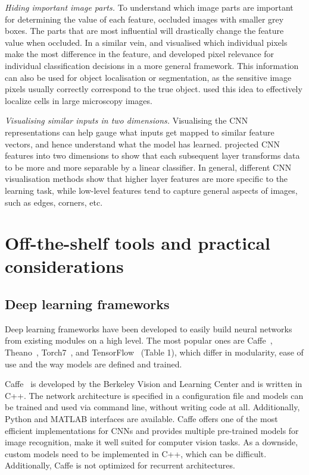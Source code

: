 \textit{Hiding important image parts.} To understand which image parts are important for determining the value of each feature, \citet{zeiler_visualizing_2014-1} occluded images with smaller grey boxes. The parts that are most influential will drastically change the feature value when occluded. In a similar vein, \citet{simonyan_deep_2013} and \citet{springenberg_striving_2014} visualised which individual pixels make the most difference in the feature, and \citet{bach_pixel-wise_2015} developed pixel relevance for individual classification decisions in a more general framework. This information can also be used for object localisation or segmentation, as the sensitive image pixels usually correctly correspond to the true object. \citet{kraus_classifying_2015} used this idea to effectively localize cells in large microscopy images.

\textit{Visualising similar inputs in two dimensions.} Visualising the CNN representations can help gauge what inputs get mapped to similar feature vectors, and hence understand what the model has learned. \citet{donahue_decaf:_2013} projected CNN features into two dimensions to show that each subsequent layer transforms data to be more and more separable by a linear classifier. In general, different CNN visualisation methods show that higher layer features are more specific to the learning task, while low-level features tend to capture general aspects of images, such as edges, corners, etc.


\section{Off-the-shelf tools and practical considerations}

\subsection{Deep learning frameworks}

Deep learning frameworks have been developed to easily build neural networks from existing modules on a high level. The most popular ones are Caffe~\citep{jia_caffe:_2014}, Theano~\citep{bastien_theano:_2012}, Torch7~\citep{collobert_torch7:_2011}, and TensorFlow~\citep{abadi_tensorflow:_2016} (Table 1), which differ in modularity, ease of use and the way models are defined and trained.

Caffe~\citep{jia_caffe:_2014} is developed by the Berkeley Vision and Learning Center and is written in C++. The network architecture is specified in a configuration file and models can be trained and used via command line, without writing code at all. Additionally, Python and MATLAB interfaces are available. Caffe offers one of the most efficient implementations for CNNs and provides multiple pre-trained models for image recognition, make it well suited for computer vision tasks. As a downside, custom models need to be implemented in C++, which can be difficult. Additionally, Caffe is not optimized for recurrent architectures.

